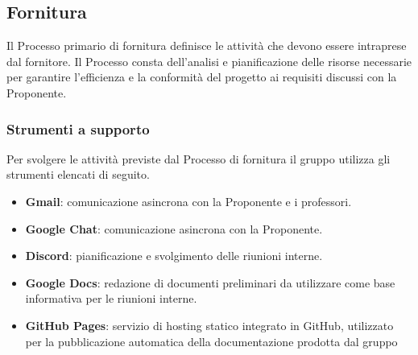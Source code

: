 \documentclass[a4paper,12pt]{article}
\begin{document}
\subsection{Fornitura} \label{sec:processo-fornitura}
Il Processo primario di fornitura definisce le attività che devono essere 
intraprese dal fornitore. Il Processo consta dell’analisi e pianificazione delle risorse necessarie 
per garantire l’efficienza e la conformità del progetto ai requisiti discussi con la Proponente.

\subsubsection{Strumenti a supporto}
Per svolgere le attività previste dal Processo di fornitura il gruppo utilizza gli strumenti elencati di seguito.
\begin{itemize}
    \item \textbf{Gmail}: comunicazione asincrona con la Proponente e i professori.
    \item \textbf{Google Chat}: comunicazione asincrona con la Proponente.
    \item \textbf{Discord}: pianificazione e svolgimento delle riunioni interne.
    \item \textbf{Google Docs}: redazione di documenti preliminari da utilizzare come base informativa per le riunioni interne.
    \item \textbf{GitHub Pages}: servizio di hosting statico integrato in GitHub, utilizzato per la pubblicazione automatica della documentazione prodotta dal gruppo
\end{itemize}
\end{document}
